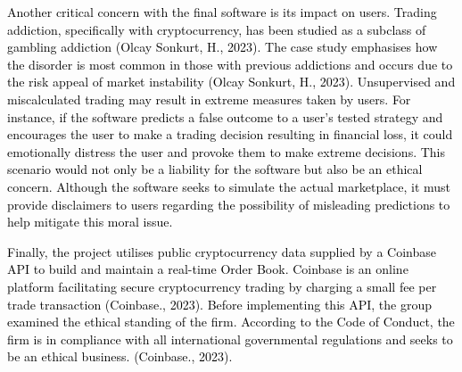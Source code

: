 \documentclass[acmtog, nonacm]{acmart}
\begin{document}
\textcolor{black}{Another critical concern with the final software is its impact on users. Trading addiction, specifically with cryptocurrency, has been studied as a subclass of gambling addiction (Olcay Sonkurt, H., 2023). The case study emphasises how the disorder is most common in those with previous addictions and occurs due to the risk appeal of market instability (Olcay Sonkurt, H., 2023). Unsupervised and miscalculated trading may result in extreme measures taken by users. For instance, if the software predicts a false outcome to a user's tested strategy and encourages the user to make a trading decision resulting in financial loss, it could emotionally distress the user and provoke them to make extreme decisions. This scenario would not only be a liability for the software but also be an ethical concern. Although the software seeks to simulate the actual marketplace, it must provide disclaimers to users regarding the possibility of misleading predictions to help mitigate this moral issue.}

\textcolor{black}{Finally, the project utilises public cryptocurrency data supplied by a Coinbase API to build and maintain a real-time Order Book. Coinbase is an online platform facilitating secure cryptocurrency trading by charging a small fee per trade transaction (Coinbase., 2023). Before implementing this API, the group examined the ethical standing of the firm. According to the Code of Conduct, the firm is in compliance with all international governmental regulations and seeks to be an ethical business. (Coinbase., 2023). 
}
\end{document}
